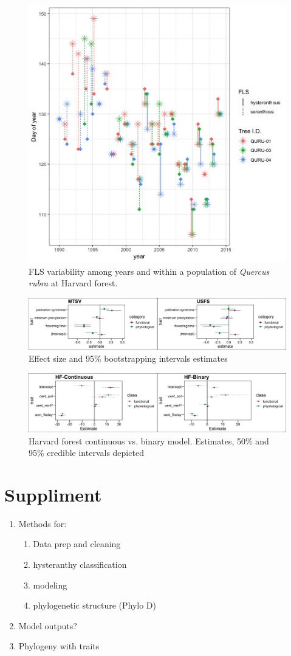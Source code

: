 \documentclass[12pt]{article}\usepackage[]{graphicx}\usepackage[]{color}
\begin{document}
 \begin{figure}
        \centering
          \includegraphics[width=.75\textwidth]{..//figure/HFdissplot.jpeg}
        \caption{FLS variability among years and within a population of \textit{Quercus rubra} at Harvard forest.}
        \label{fig: Figure 3}
    \end{figure}
  
    \begin{figure}
    \centering
    \includegraphics[width=\textwidth]{..//figure/Mtsv_usfs_sidexside.jpeg}
    \caption{Effect size and 95\% bootstrapping intervals estimates}
    \label{fig:Figure 4}
    \end{figure}
    
        \begin{figure}
    \centering
    \includegraphics[width=\textwidth]{..//figure/HF_cont_v_bin.jpeg}
    \caption{Harvard forest continuous vs. binary model. Estimates, 50\% and 95\% credible intervals depicted}
    \label{fig:Figure 5}
    \end{figure}
\pagebreak


\section*{Suppliment}
\begin{enumerate}
\item Methods for:
  \begin{enumerate}
    \item Data prep and cleaning
    \item hysteranthy classification
    \item modeling
    \item phylogenetic structure (Phylo D)
  \end{enumerate}
\item Model outputs?
\item Phylogeny with traits 
\end{enumerate}
\end{document}
